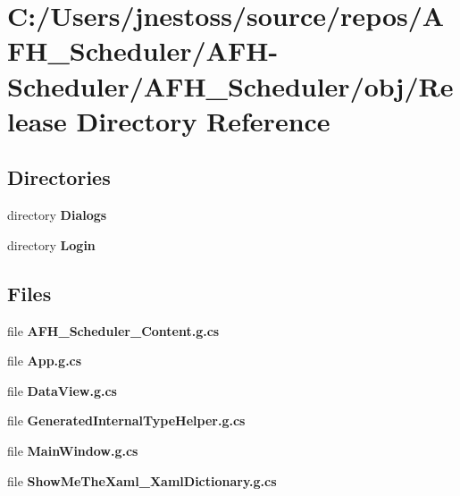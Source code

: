 \section{C\+:/\+Users/jnestoss/source/repos/\+A\+F\+H\+\_\+\+Scheduler/\+A\+F\+H-\/\+Scheduler/\+A\+F\+H\+\_\+\+Scheduler/obj/\+Release Directory Reference}
\label{dir_a6d59948df30d312d2a18139c4aeb7e0}
\subsection*{Directories}
\begin{DoxyCompactItemize}
\item 
directory \textbf{ Dialogs}
\item 
directory \textbf{ Login}
\end{DoxyCompactItemize}
\subsection*{Files}
\begin{DoxyCompactItemize}
\item 
file \textbf{ A\+F\+H\+\_\+\+Scheduler\+\_\+\+Content.\+g.\+cs}
\item 
file \textbf{ App.\+g.\+cs}
\item 
file \textbf{ Data\+View.\+g.\+cs}
\item 
file \textbf{ Generated\+Internal\+Type\+Helper.\+g.\+cs}
\item 
file \textbf{ Main\+Window.\+g.\+cs}
\item 
file \textbf{ Show\+Me\+The\+Xaml\+\_\+\+Xaml\+Dictionary.\+g.\+cs}
\end{DoxyCompactItemize}
